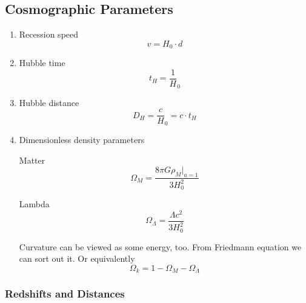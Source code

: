 \documentclass[11pt]{book}
\begin{document}
\subsection{Cosmographic Parameters}
\begin{enumerate}
\item
Recession speed
\begin{equation}
v = H_0 \cdot d
\end{equation}

\item
Hubble time
\begin{equation}
	t_H = \frac 1 H_0
\end{equation}

\item
Hubble distance
\begin{equation}
	D_H = \frac c H_0 = c \cdot t_H
\end{equation}

\item
Dimensionless density parameters

Matter
\begin{equation}
	\Omega_M = \frac{8\pi G \rho_M |_{a=1}}{3H_0^2}
\end{equation}

Lambda
\begin{equation}
	\Omega_\Lambda = \frac{\Lambda c^2}{3H_0^2}
\end{equation}

Curvature can be viewed as some energy, too.
From Friedmann equation we can sort out it. Or equivalently
\begin{equation}
	\Omega_k = 1- \Omega_M- \Omega_\Lambda
\end{equation}

\end{enumerate}




\subsubsection{Redshifts and Distances}
\end{document}
